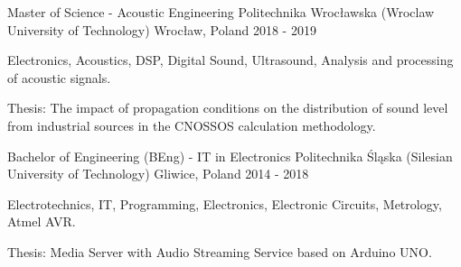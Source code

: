

\begin{cventries}

  \cventry
    {Master of Science - Acoustic Engineering} %
    {Politechnika Wrocławska (Wroclaw University of Technology)} %
    {Wrocław, Poland} %
    {2018 - 2019} %
    {
      \begin{cvitems} %
        \item {Electronics, Acoustics, DSP, Digital Sound, Ultrasound, Analysis and processing of acoustic signals.}
        \item {Thesis: The impact of propagation conditions on the distribution of sound level from industrial sources in the CNOSSOS calculation methodology.}
      \end{cvitems}
    }

  \cventry
    {Bachelor of Engineering (BEng) - IT in Electronics} %
    {Politechnika Śląska (Silesian University of Technology)} %
    {Gliwice, Poland} %
    {2014 - 2018} %
    {
      \begin{cvitems} %
        \item {Electrotechnics, IT, Programming, Electronics, Electronic Circuits, Metrology, Atmel AVR.}
        \item {Thesis: Media Server with Audio Streaming Service based on Arduino UNO.}
      \end{cvitems}
    }

\end{cventries}
